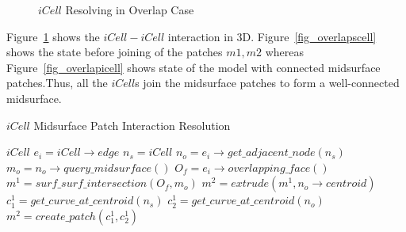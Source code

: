 	\begin{figure}[!h]
	\centering     %
	\quad
	\caption{$iCell$ Resolving in Overlap Case} %
	\label{fig_icellsovrelap}
	\end{figure}
	


Figure~\ref{fig_icellsovrelap} shows the $iCell-iCell$ interaction in 3D. Figure~\ref{fig_overlapscell} shows the state before joining of the patches $m1,m2$ whereas  Figure~\ref{fig_overlapicell} shows state of the model with connected midsurface patches.Thus, all the $iCell$s join the midsurface patches to form a well-connected midsurface.



\bigskip
	
	\begin{algorithm}[H]
		\caption{$iCell$ Midsurface Patch Interaction Resolution}
		\label{alg:midsurfcelljoin:MidsurfiCell}
		\begin{algorithmic}[1]
			\REQUIRE $iCell$
				\STATE $e_i = iCell \rightarrow edge$
				\STATE $n_s = iCell $	
				\STATE $n_o = e_i \rightarrow get\_adjacent\_node(n_s) $			
					\STATE $m_o = n_o \rightarrow query\_midsurface()$
					\STATE $O_f = e_i \rightarrow overlapping\_face()$
					\STATE $m^1 = surf\_surf\_intersection(O_f, m_o)$
					\STATE $m^2 = extrude(m^1, n_o \rightarrow centroid)$
					\STATE $c^1_1= get\_curve\_at\_centroid(n_s)$
					\STATE $c^1_2 = get\_curve\_at\_centroid(n_o)$
					\STATE $m^2 = create\_patch(c^1_1, c^1_2)$
					\ENDIF
			\ENDWHILE
		\end{algorithmic}
	\end{algorithm}

